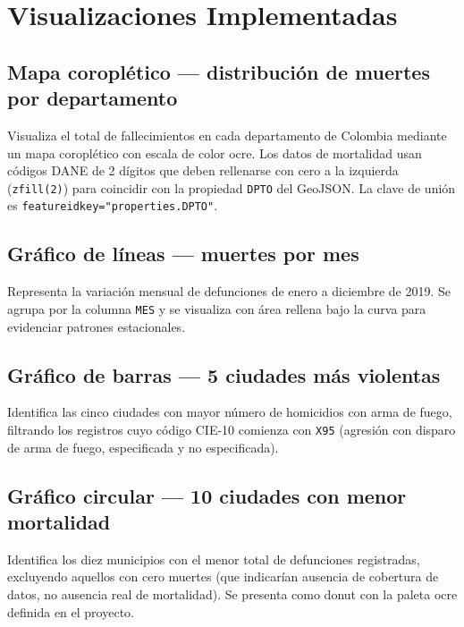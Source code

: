 \documentclass[a4paper,12pt]{report}
\numberwithin{equation}{chapter}
\numberwithin{figure}{chapter}
\numberwithin{table}{chapter}
\begin{document}
\chapter{Visualizaciones Implementadas}\label{chap:visualizaciones}

\section{Mapa coroplético — distribución de muertes por departamento}

Visualiza el total de fallecimientos en cada departamento de Colombia mediante un mapa coroplético con escala de color ocre. Los datos de mortalidad usan códigos DANE de 2 dígitos que deben rellenarse con cero a la izquierda (\texttt{zfill(2)}) para coincidir con la propiedad \texttt{DPTO} del GeoJSON. La clave de unión es \texttt{featureidkey="properties.DPTO"}.

\section{Gráfico de líneas — muertes por mes}

Representa la variación mensual de defunciones de enero a diciembre de 2019. Se agrupa por la columna \texttt{MES} y se visualiza con área rellena bajo la curva para evidenciar patrones estacionales.

\section{Gráfico de barras — 5 ciudades más violentas}

Identifica las cinco ciudades con mayor número de homicidios con arma de fuego, filtrando los registros cuyo código CIE-10 comienza con \texttt{X95} (agresión con disparo de arma de fuego, especificada y no especificada).



\section{Gráfico circular — 10 ciudades con menor mortalidad}

Identifica los diez municipios con el menor total de defunciones registradas, excluyendo aquellos con cero muertes (que indicarían ausencia de cobertura de datos, no ausencia real de mortalidad). Se presenta como donut con la paleta ocre definida en el proyecto.
\end{document}
